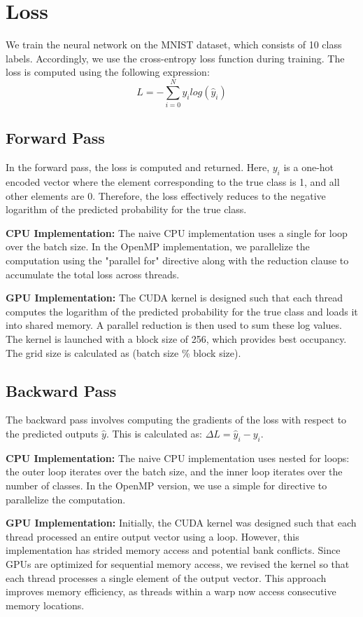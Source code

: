 \section{Loss}

We train the neural network on the MNIST dataset, which consists of 10 class labels. Accordingly, we use the cross-entropy loss function during training. The loss is computed using the following expression:
$$ L = -\sum_{i=0} ^ N y_i log(\hat{y}_i) $$

\subsection{Forward Pass}
In the forward pass, the loss is computed and returned. Here, $y_i$ is a one-hot encoded vector where the element corresponding to the true class is 1, and all other elements are 0. Therefore, the loss effectively reduces to the negative logarithm of the predicted probability for the true class.

\textbf{CPU Implementation:}  
The naive CPU implementation uses a single for loop over the batch size. In the OpenMP implementation, we parallelize the computation using the "parallel for" directive along with the reduction clause to accumulate the total loss across threads.  

\textbf{GPU Implementation:}  
The CUDA kernel is designed such that each thread computes the logarithm of the predicted probability for the true class and loads it into shared memory. A parallel reduction is then used to sum these log values. The kernel is launched with a block size of 256, which provides best occupancy. The grid size is calculated as (batch size \% block size).

\subsection{Backward Pass}
The backward pass involves computing the gradients of the loss with respect to the predicted outputs $\hat{y}$. This is calculated as:
$ \Delta L = \hat{y}_i - y_i$. 

\textbf{CPU Implementation:}
The naive CPU implementation uses nested for loops: the outer loop iterates over the batch size, and the inner loop iterates over the number of classes. In the OpenMP version, we use a simple for directive to parallelize the computation.


\textbf{GPU Implementation:}  
Initially, the CUDA kernel was designed such that each thread processed an entire output vector using a loop. However, this implementation has strided memory access and potential bank conflicts. Since GPUs are optimized for sequential memory access, we revised the kernel so that each thread processes a single element of the output vector. This approach improves memory efficiency, as threads within a warp now access consecutive memory locations.